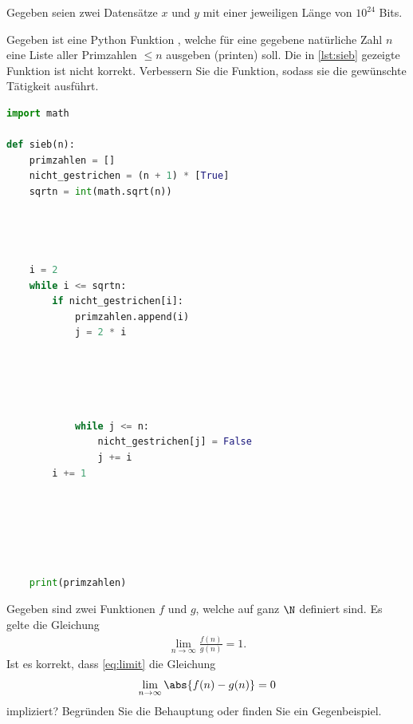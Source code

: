 \begin{questions}
\question Gegeben seien zwei Datensätze $x$ und $y$ mit einer jeweiligen Länge von $10^{24}$ Bits. 
\droptotalpoints

\clearpage
\question[2]
Gegeben ist eine Python Funktion , welche für eine gegebene natürliche Zahl $n$ eine Liste aller Primzahlen $\leq n$ ausgeben (printen) soll. Die in \cref{lst:sieb} gezeigte Funktion ist nicht korrekt. Verbessern Sie die Funktion, sodass sie die gewünschte Tätigkeit ausführt.
\begin{lstlisting}[language=Python,caption=(noch nicht korrektes) Sieb des Eratosthenes,numbers=none,label=lst:sieb]
import math

def sieb(n):
    primzahlen = []
    nicht_gestrichen = (n + 1) * [True]
    sqrtn = int(math.sqrt(n))




    i = 2
    while i <= sqrtn:
        if nicht_gestrichen[i]:
            primzahlen.append(i)
            j = 2 * i





            while j <= n:
                nicht_gestrichen[j] = False
                j += i
        i += 1






    print(primzahlen)
\end{lstlisting}



\question[2]
Gegeben sind zwei Funktionen $f$ und $g$, welche auf ganz $\N$ definiert sind. Es gelte die Gleichung
\begin{align}\label{eq:limit}
  \lim_{n\to\infty}\frac{f(n)}{g(n)} = 1.
\end{align}
Ist es korrekt, dass \cref{eq:limit} die Gleichung
\begin{align*}
  \lim_{n\to\infty} \abs{f(n) - g(n)} = 0
\end{align*}
impliziert? Begründen Sie die Behauptung oder finden Sie ein Gegenbeispiel.



\end{questions}
